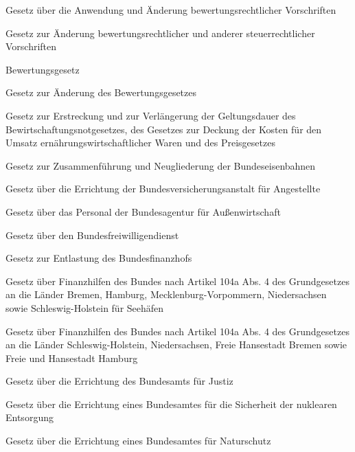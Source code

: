 \item[{BewÄndG}] Gesetz über die Anwendung und Änderung bewertungsrechtlicher Vorschriften

\item[{BewÄndG-1971}] Gesetz zur Änderung bewertungsrechtlicher und anderer steuerrechtlicher Vorschriften

\item[{BewG}] Bewertungsgesetz

\item[{BewGÄndG}] Gesetz zur Änderung des Bewertungsgesetzes

\item[{BewiNotGVerlG}] Gesetz zur Erstreckung und zur Verlängerung der Geltungsdauer des Bewirtschaftungsnotgesetzes, des Gesetzes zur Deckung der Kosten für den Umsatz ernährungswirtschaftlicher Waren und des Preisgesetzes

\item[{BEZNG}] Gesetz zur Zusammenführung und Neugliederung der Bundeseisenbahnen

\item[{BfAG}] Gesetz über die Errichtung der Bundesversicherungsanstalt für Angestellte

\item[{BfAIPG}] Gesetz über das Personal der Bundesagentur für Außenwirtschaft

\item[{BFDG}] Gesetz über den Bundesfreiwilligendienst

\item[{BFHEntlG}] Gesetz zur Entlastung des Bundesfinanzhofs

\item[{BFinHBRuaG}] Gesetz über Finanzhilfen des Bundes nach Artikel 104a Abs. 4 des Grundgesetzes an die Länder Bremen, Hamburg, Mecklenburg-Vorpommern, Niedersachsen sowie Schleswig-Holstein für Seehäfen

\item[{BFinHSHuaG}] Gesetz über Finanzhilfen des Bundes nach Artikel 104a Abs. 4 des Grundgesetzes an die Länder Schleswig-Holstein, Niedersachsen, Freie Hansestadt Bremen sowie Freie und Hansestadt Hamburg

\item[{BfJG}] Gesetz über die Errichtung des Bundesamts für Justiz

\item[{BfkEG}] Gesetz über die Errichtung eines Bundesamtes für die Sicherheit der nuklearen Entsorgung

\item[{BfNatSchG}] Gesetz über die Errichtung eines Bundesamtes für Naturschutz

